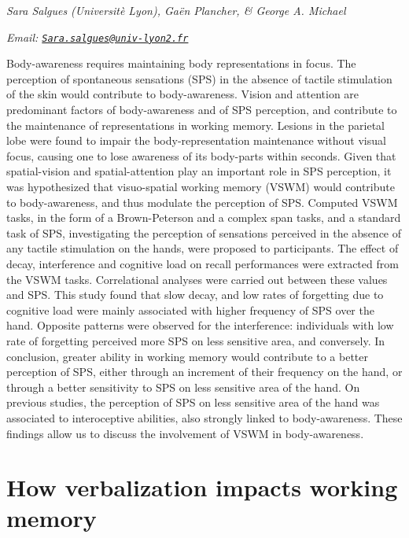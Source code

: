 \documentclass[12pt,]{book}
\begin{document}
\emph{Sara Salgues (Universitè Lyon), Gaën Plancher, \& George A. Michael}

\emph{Email: \href{mailto:Sara.salgues@univ-lyon2.fr}{\nolinkurl{Sara.salgues@univ-lyon2.fr}}}

Body-awareness requires maintaining body representations in focus. The perception of spontaneous sensations (SPS) in the absence of tactile stimulation of the skin would contribute to body-awareness. Vision and attention are predominant factors of body-awareness and of SPS perception, and contribute to the maintenance of representations in working memory. Lesions in the parietal lobe were found to impair the body-representation maintenance without visual focus, causing one to lose awareness of its body-parts within seconds. Given that spatial-vision and spatial-attention play an important role in SPS perception, it was hypothesized that visuo-spatial working memory (VSWM) would contribute to body-awareness, and thus modulate the perception of SPS. Computed VSWM tasks, in the form of a Brown-Peterson and a complex span tasks, and a standard task of SPS, investigating the perception of sensations perceived in the absence of any tactile stimulation on the hands, were proposed to participants. The effect of decay, interference and cognitive load on recall performances were extracted from the VSWM tasks. Correlational analyses were carried out between these values and SPS. This study found that slow decay, and low rates of forgetting due to cognitive load were mainly associated with higher frequency of SPS over the hand. Opposite patterns were observed for the interference: individuals with low rate of forgetting perceived more SPS on less sensitive area, and conversely. In conclusion, greater ability in working memory would contribute to a better perception of SPS, either through an increment of their frequency on the hand, or through a better sensitivity to SPS on less sensitive area of the hand. On previous studies, the perception of SPS on less sensitive area of the hand was associated to interoceptive abilities, also strongly linked to body-awareness. These findings allow us to discuss the involvement of VSWM in body-awareness.

\hypertarget{how-verbalization-impacts-working-memory}{%
\chapter{How verbalization impacts working memory}\label{how-verbalization-impacts-working-memory}}
\end{document}
